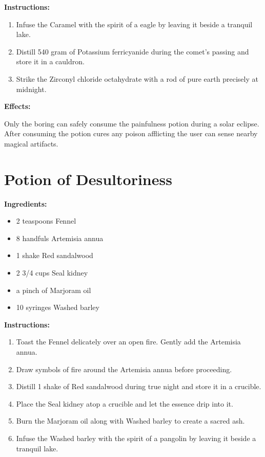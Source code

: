 \documentclass{article}
\begin{document}
\textbf{Instructions:}

\begin{enumerate}
  \item Infuse the Caramel with the spirit of a eagle by leaving it beside a tranquil lake.
  \item Distill 540 gram of Potassium ferricyanide during the comet’s passing and store it in a cauldron.
  \item Strike the Zirconyl chloride octahydrate with a rod of pure earth precisely at midnight.
\end{enumerate}

\textbf{Effects:}

Only the boring can safely consume the painfulness potion during a solar eclipse. After consuming the potion cures any poison afflicting the user can sense nearby magical artifacts.

\newpage
\section*{Potion of Desultoriness}

\textbf{Ingredients:}

\begin{itemize}
  \item 2 teaspoons Fennel
  \item 8 handfuls Artemisia annua
  \item 1 shake Red sandalwood
  \item 2 3/4 cups Seal kidney
  \item a pinch of Marjoram oil
  \item 10 syringes Washed barley
\end{itemize}

\textbf{Instructions:}

\begin{enumerate}
  \item Toast the Fennel delicately over an open fire. Gently add the Artemisia annua.
  \item Draw symbols of fire around the Artemisia annua before proceeding.
  \item Distill 1 shake of Red sandalwood during true night and store it in a crucible.
  \item Place the Seal kidney atop a crucible and let the essence drip into it.
  \item Burn the Marjoram oil along with Washed barley to create a sacred ash.
  \item Infuse the Washed barley with the spirit of a pangolin by leaving it beside a tranquil lake.
\end{enumerate}
\end{document}
